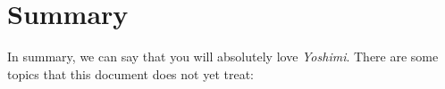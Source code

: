 \documentclass[
 11pt,
 twoside,
 a4paper,
 headinclude,
 footinclude,
 final                                 %
]{article}
\begin{document}





















































\section{Summary}
\label{sec:summary}

   In summary, we can say that you will absolutely love \textsl{Yoshimi}.
   There are some topics that this document does not yet treat:
\end{document}
